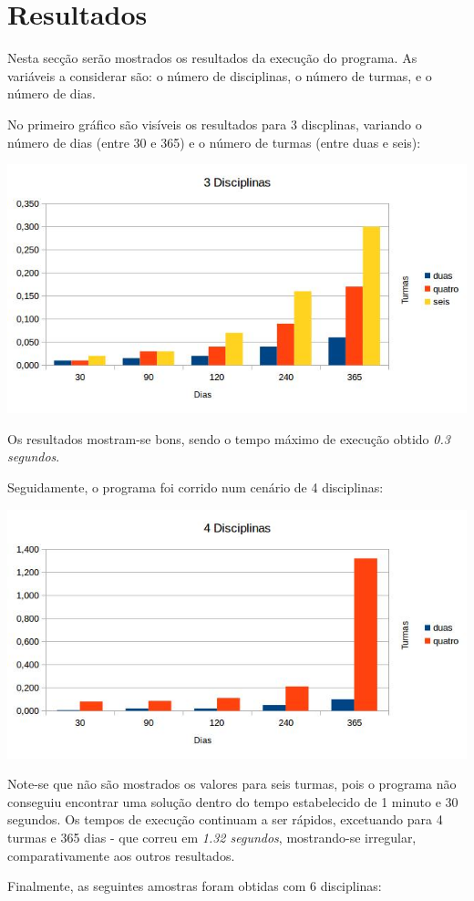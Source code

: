 \documentclass{llncs}
\begin{document}
\section{Resultados}
Nesta secção serão mostrados os resultados da execução do programa. As variáveis a considerar são: o número de disciplinas, o número de turmas, e o número de dias.\par
No primeiro gráfico são visíveis os resultados para 3 discplinas, variando o número de dias (entre 30 e 365) e o número de turmas (entre duas e seis):

\includegraphics[scale=0.85]{images/chart1.jpg}

Os resultados mostram-se bons, sendo o tempo máximo de execução obtido \textit{0.3 segundos}.\par
Seguidamente, o programa foi corrido num cenário de 4 disciplinas:

\includegraphics[scale=0.85]{images/chart2.jpg}

Note-se que não são mostrados os valores para seis turmas, pois o programa não conseguiu encontrar uma solução dentro do tempo estabelecido de 1 minuto e 30 segundos.\newline 
Os tempos de execução continuam a ser rápidos, excetuando para 4 turmas e 365 dias - que correu em \textit{1.32 segundos}, mostrando-se irregular, comparativamente aos outros resultados.\par
Finalmente, as seguintes amostras foram obtidas com 6 disciplinas:
\end{document}
